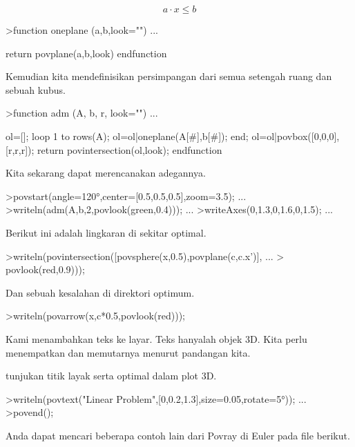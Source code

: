 \documentclass[a4paper,10pt]{article}
\begin{document}
\begin{eulernotebook}
\begin{eulercomment}
\begin{eulercomment}
\begin{eulercomment}
\end{eulercomment}
\begin{eulerformula}
\[
a \cdot x \le b
\]
\end{eulerformula}
\begin{eulerprompt}
>function oneplane (a,b,look="") ...
\end{eulerprompt}
\begin{eulerudf}
    return povplane(a,b,look)
  endfunction
\end{eulerudf}
\begin{eulercomment}
Kemudian kita mendefinisikan persimpangan dari semua setengah ruang
dan sebuah kubus.
\end{eulercomment}
\begin{eulerprompt}
>function adm (A, b, r, look="") ...
\end{eulerprompt}
\begin{eulerudf}
    ol=[];
    loop 1 to rows(A); ol=ol|oneplane(A[#],b[#]); end;
    ol=ol|povbox([0,0,0],[r,r,r]);
    return povintersection(ol,look);
  endfunction
\end{eulerudf}
\begin{eulercomment}
Kita sekarang dapat merencanakan adegannya.
\end{eulercomment}
\begin{eulerprompt}
>povstart(angle=120°,center=[0.5,0.5,0.5],zoom=3.5); ...
>writeln(adm(A,b,2,povlook(green,0.4))); ...
>writeAxes(0,1.3,0,1.6,0,1.5); ...
\end{eulerprompt}
\begin{eulercomment}
Berikut ini adalah lingkaran di sekitar optimal.
\end{eulercomment}
\begin{eulerprompt}
>writeln(povintersection([povsphere(x,0.5),povplane(c,c.x')], ...
>  povlook(red,0.9)));
\end{eulerprompt}
\begin{eulercomment}
Dan sebuah kesalahan di direktori optimum.
\end{eulercomment}
\begin{eulerprompt}
>writeln(povarrow(x,c*0.5,povlook(red)));
\end{eulerprompt}
\begin{eulercomment}
Kami menambahkan teks ke layar. Teks hanyalah objek 3D. Kita perlu
menempatkan dan memutarnya menurut pandangan kita.\\
\end{eulercomment}
\begin{eulerttcomment}
 tunjukan titik layak serta optimal dalam plot 3D.
\end{eulerttcomment}
\begin{eulerprompt}
>writeln(povtext("Linear Problem",[0,0.2,1.3],size=0.05,rotate=5°)); ...
>povend();
\end{eulerprompt}
\begin{eulercomment}
Anda dapat mencari beberapa contoh lain dari Povray di Euler pada file
berikut.


\end{eulercomment}
\end{eulercomment}
\end{eulercomment}
\end{eulernotebook}
\end{document}
